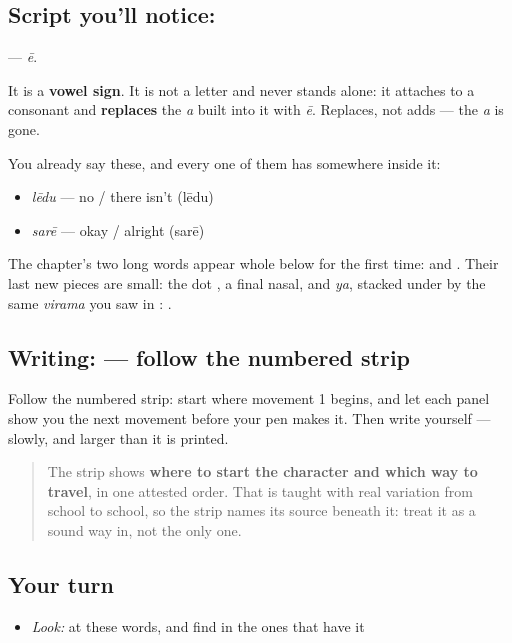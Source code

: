 \subsection*{Script you'll notice: }
\textbf{} — \emph{ē}.

It is a \textbf{vowel sign}. It is not a letter and never stands alone: it attaches to a consonant and \textbf{replaces} the \emph{a} built into it with \emph{ē}. Replaces, not adds — the \emph{a} is gone.

You already say these, and every one of them has  somewhere inside it:

\begin{itemize}
\raggedright
  \item \textbf{} \emph{lēdu} — no / there isn't (lēdu)
  \item \textbf{} \emph{sarē} — okay / alright (sarē)
\end{itemize}

The chapter's two long words appear whole below for the first time: \textbf{} and \textbf{}. Their last new pieces are small: the dot \textbf{}, a final nasal, and \textbf{} \emph{ya}, stacked under  by the same \emph{virama} \textbf{} you saw in \textbf{}: \textbf{}.

\subsection*{Writing:  — follow the numbered strip}

Follow the numbered strip: start where movement 1 begins, and let each panel show you the next movement before your pen makes it. Then write  yourself — slowly, and larger than it is printed.

\begin{quote}
The strip shows \textbf{where to start the character and which way to travel}, in one attested order. That is taught with real variation from school to school, so the strip names its source beneath it: treat it as a sound way in, not the only one.
\end{quote}

\subsection*{Your turn}
\begin{itemize}
\raggedright
  \item \emph{Look:} at these words, and find  in the ones that have it
\end{itemize}

